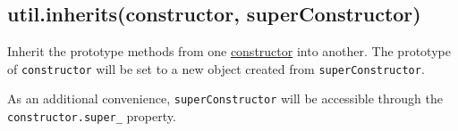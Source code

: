 \subsection{util.inherits(constructor, superConstructor)}

Inherit the prototype methods from one
\href{https://developer.mozilla.org/en/JavaScript/Reference/Global\_Objects/Object/constructor}{constructor}
into another. The prototype of \texttt{constructor} will be set to a new
object created from \texttt{superConstructor}.

As an additional convenience, \texttt{superConstructor} will be
accessible through the \texttt{constructor.super\_} property.

\begin{Shaded}
\begin{Highlighting}[]
 \NormalTok{);}
 \NormalTok{);}

 
    \NormalTok{(}\NormalTok{);}
\NormalTok{\}}

\NormalTok{);}

 \NormalTok{= }
    \NormalTok{(}
\NormalTok{\}}

  

\NormalTok{); }
\NormalTok{(}\NormalTok{_ === }\NormalTok{); }

\NormalTok{(}\NormalTok{, }
    \NormalTok{(} \NormalTok{);}
\NormalTok{\})}
\NormalTok{(}\NormalTok{); }
\end{Highlighting}
\end{Shaded}

